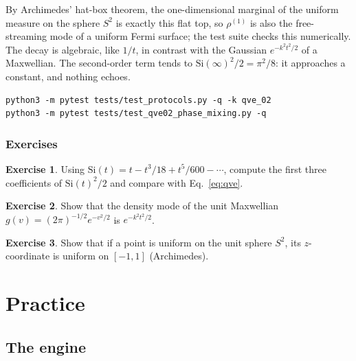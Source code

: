 \documentclass[11pt,a4paper,openany]{book}
\theoremstyle{definition}
\newtheorem{exercise}{Exercise}[chapter]
\theoremstyle{plain}
\begin{document}
By Archimedes' hat-box theorem, the one-dimensional marginal of the uniform measure on the sphere
$S^2$ is exactly this flat top, so $\rho^{(1)}$ is also the free-streaming mode of a uniform Fermi
surface; the test suite checks this numerically. The decay is algebraic, like $1/t$, in contrast
with the Gaussian $e^{-k^2t^2/2}$ of a Maxwellian. The second-order term tends to
$\mathrm{Si}(\infty)^2/2=\pi^2/8$: it approaches a constant, and nothing echoes.

\begin{runit}
\begin{verbatim}
python3 -m pytest tests/test_protocols.py -q -k qve_02
python3 -m pytest tests/test_qve02_phase_mixing.py -q
\end{verbatim}
\end{runit}

\section*{Exercises}
\begin{exercise}\label{ex:si}
Using $\mathrm{Si}(t)=t-t^3/18+t^5/600-\cdots$, compute the first three coefficients of
$\mathrm{Si}(t)^2/2$ and compare with Eq.~\eqref{eq:qve}.
\end{exercise}
\begin{exercise}\label{ex:maxwellmode}
Show that the density mode of the unit Maxwellian $g(v)=(2\pi)^{-1/2}e^{-v^2/2}$ is
$e^{-k^2t^2/2}$.
\end{exercise}
\begin{exercise}\label{ex:hatbox}
Show that if a point is uniform on the unit sphere $S^2$, its $z$-coordinate is uniform on
$[-1,1]$ (Archimedes).
\end{exercise}

\part{Practice}

\chapter{The engine}
\label{ch:engine}
\end{document}
